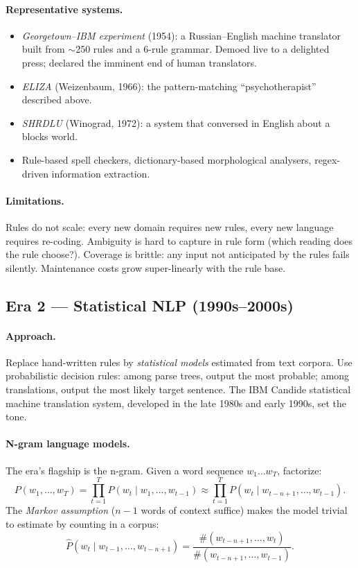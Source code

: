 \documentclass[12pt,a4paper]{report}
\theoremstyle{definition}
\theoremstyle{remark}
\begin{document}
\paragraph{Representative systems.}
\begin{itemize}
    \item \emph{Georgetown--IBM experiment} (1954): a Russian--English machine translator built from $\sim$250 rules and a 6-rule grammar. Demoed live to a delighted press; declared the imminent end of human translators.
    \item \emph{ELIZA} (Weizenbaum, 1966): the pattern-matching ``psychotherapist'' described above.
    \item \emph{SHRDLU} (Winograd, 1972): a system that conversed in English about a blocks world.
    \item Rule-based spell checkers, dictionary-based morphological analysers, regex-driven information extraction.
\end{itemize}

\paragraph{Limitations.} Rules do not scale: every new domain requires new rules, every new language requires re-coding. Ambiguity is hard to capture in rule form (which reading does the rule choose?). Coverage is brittle: any input not anticipated by the rules fails silently. Maintenance costs grow super-linearly with the rule base.

\subsection{Era 2 --- Statistical NLP (1990s--2000s)}

\paragraph{Approach.} Replace hand-written rules by \emph{statistical models} estimated from text corpora. Use probabilistic decision rules: among parse trees, output the most probable; among translations, output the most likely target sentence. The IBM Candide statistical machine translation system, developed in the late 1980s and early 1990s, set the tone.

\paragraph{N-gram language models.} The era's flagship is the n-gram. Given a word sequence $w_1 \dots w_T$, factorize:
\[ P(w_1, \dots, w_T) = \prod_{t=1}^{T} P(w_t \mid w_1, \dots, w_{t-1}) \approx \prod_{t=1}^{T} P(w_t \mid w_{t-n+1}, \dots, w_{t-1}). \]
The \emph{Markov assumption} ($n-1$ words of context suffice) makes the model trivial to estimate by counting in a corpus:
\[ \widehat{P}(w_t \mid w_{t-1}, \dots, w_{t-n+1}) = \frac{\#(w_{t-n+1}, \dots, w_t)}{\#(w_{t-n+1}, \dots, w_{t-1})}. \]
\end{document}
